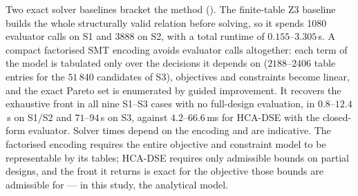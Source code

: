 %
Two exact solver baselines bracket the method (\RefSolverTab{}). The finite-table Z3 baseline builds the whole structurally valid relation before solving, so it spends 1080 evaluator calls on S1 and 3888 on S2, with a total runtime of $0.155\text{--}3.305$\,s. A compact factorised SMT encoding avoids evaluator calls altogether: each term of the model is tabulated only over the decisions it depends on ($2188\text{--}2406$ table entries for the $51\,840$ candidates of S3), objectives and constraints become linear, and the exact Pareto set is enumerated by guided improvement. It recovers the exhaustive front in all nine S1--S3 cases with no full-design evaluation, in $0.8\text{--}12.4$\,s on S1/S2 and $71\text{--}94$\,s on S3, against $4.2\text{--}66.6$\,ms for HCA-DSE with the closed-form evaluator. Solver times depend on the encoding and are indicative. The factorised encoding requires the entire objective and constraint model to be representable by its tables; HCA-DSE requires only admissible bounds on partial designs, and the front it returns is exact for the objective those bounds are admissible for --- in this study, the analytical model.
